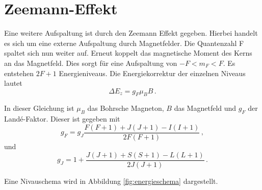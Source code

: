 \section{Zeemann-Effekt}
\label{sec:zeemann}
Eine weitere Aufspaltung ist durch den Zeemann Effekt gegeben. Hierbei handelt es sich um eine externe Aufspaltung durch Magnetfelder. Die Quantenzahl F spaltet sich nun weiter auf.
Erneut koppelt das magnetische Moment des Kerns an das Magnetfeld. Dies sorgt für eine Aufspaltung von $-F < m_F < F$. Es entstehen $2F+1$ Energieniveaus. Die Energiekorrektur 
der einzelnen Niveaus lautet 
\begin{equation}
              \label{eqn:dEz}
              \Delta E_z = g_F\mu_BB \,.
\end{equation}

In dieser Gleichung ist $\mu_B$ das Bohrsche Magneton, $B$ das Magnetfeld und $g_F$ der Land\'{e}-Faktor. Dieser ist gegeben mit 
\begin{equation}
              \label{eqn:g_F}
              g_F = g_J \frac{F(F+1)+J(J+1)-I(I+1)}{2F(F+1)}\,,
\end{equation}
und 
\begin{equation}
              \label{eqn:g_j}
              g_J = 1 + \frac{J(J+1)+S(S+1)-L(L+1)}{2J(J+1)}\,.
\end{equation}

Eine Nivauschema wird in Abbildung \ref{fig:energieschema} dargestellt.

